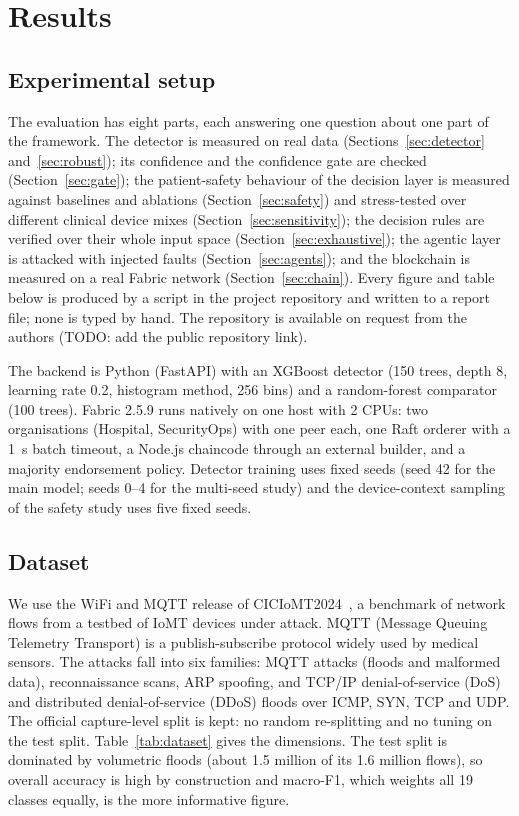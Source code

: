 \documentclass[preprint,12pt]{elsarticle}
\begin{document}
\section{Results}
\label{sec:results}

\subsection{Experimental setup}
\label{sec:setup}
The evaluation has eight parts, each answering one question about one part of the framework. The detector is measured on real data (Sections~\ref{sec:detector} and~\ref{sec:robust}); its confidence and the confidence gate are checked (Section~\ref{sec:gate}); the patient-safety behaviour of the decision layer is measured against baselines and ablations (Section~\ref{sec:safety}) and stress-tested over different clinical device mixes (Section~\ref{sec:sensitivity}); the decision rules are verified over their whole input space (Section~\ref{sec:exhaustive}); the agentic layer is attacked with injected faults (Section~\ref{sec:agents}); and the blockchain is measured on a real Fabric network (Section~\ref{sec:chain}). Every figure and table below is produced by a script in the project repository and written to a report file; none is typed by hand. The repository is available on request from the authors (TODO: add the public repository link).

The backend is Python (FastAPI) with an XGBoost detector (150 trees, depth 8, learning rate 0.2, histogram method, 256 bins) and a random-forest comparator (100 trees). Fabric 2.5.9 runs natively on one host with 2 CPUs: two organisations (Hospital, SecurityOps) with one peer each, one Raft orderer with a 1~s batch timeout, a Node.js chaincode through an external builder, and a majority endorsement policy. Detector training uses fixed seeds (seed 42 for the main model; seeds 0--4 for the multi-seed study) and the device-context sampling of the safety study uses five fixed seeds.

\subsection{Dataset}
\label{sec:dataset}
We use the WiFi and MQTT release of CICIoMT2024~\cite{dadkhah2024}, a benchmark of network flows from a testbed of IoMT devices under attack. MQTT (Message Queuing Telemetry Transport) is a publish-subscribe protocol widely used by medical sensors. The attacks fall into six families: MQTT attacks (floods and malformed data), reconnaissance scans, ARP spoofing, and TCP/IP denial-of-service (DoS) and distributed denial-of-service (DDoS) floods over ICMP, SYN, TCP and UDP. The official capture-level split is kept: no random re-splitting and no tuning on the test split. Table~\ref{tab:dataset} gives the dimensions. The test split is dominated by volumetric floods (about 1.5 million of its 1.6 million flows), so overall accuracy is high by construction and macro-F1, which weights all 19 classes equally, is the more informative figure.
\end{document}
